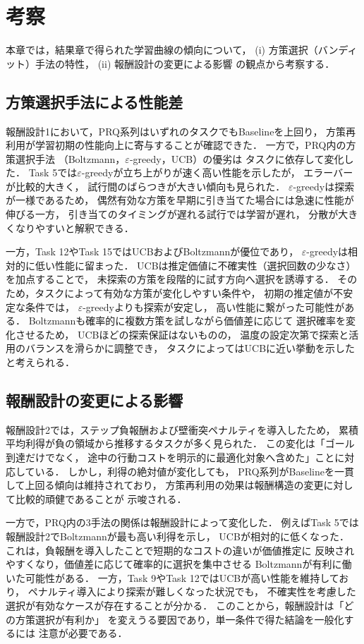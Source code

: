 \section{考察}
本章では，結果章で得られた学習曲線の傾向について，
(i) 方策選択（バンディット）手法の特性，
(ii) 報酬設計の変更による影響
の観点から考察する．

\subsection{方策選択手法による性能差}
報酬設計1において，PRQ系列はいずれのタスクでもBaselineを上回り，
方策再利用が学習初期の性能向上に寄与することが確認できた．
一方で，PRQ内の方策選択手法
（Boltzmann，$\varepsilon$-greedy，UCB）の優劣は
タスクに依存して変化した．
Task 5では$\varepsilon$-greedyが立ち上がりが速く高い性能を示したが，
エラーバーが比較的大きく，
試行間のばらつきが大きい傾向も見られた．
$\varepsilon$-greedyは探索が一様であるため，
偶然有効な方策を早期に引き当てた場合には急速に性能が伸びる一方，
引き当てのタイミングが遅れる試行では学習が遅れ，
分散が大きくなりやすいと解釈できる．

一方，Task 12やTask 15ではUCBおよびBoltzmannが優位であり，
$\varepsilon$-greedyは相対的に低い性能に留まった．
UCBは推定価値に不確実性（選択回数の少なさ）を加点することで，
未探索の方策を段階的に試す方向へ選択を誘導する．
そのため，タスクによって有効な方策が変化しやすい条件や，
初期の推定値が不安定な条件では，
$\varepsilon$-greedyよりも探索が安定し，
高い性能に繋がった可能性がある．
Boltzmannも確率的に複数方策を試しながら価値差に応じて
選択確率を変化させるため，
UCBほどの探索保証はないものの，
温度の設定次第で探索と活用のバランスを滑らかに調整でき，
タスクによってはUCBに近い挙動を示したと考えられる．

\subsection{報酬設計の変更による影響}
報酬設計2では，ステップ負報酬および壁衝突ペナルティを導入したため，
累積平均利得が負の領域から推移するタスクが多く見られた．
この変化は「ゴール到達だけでなく，
途中の行動コストを明示的に最適化対象へ含めた」ことに対応している．
しかし，利得の絶対値が変化しても，
PRQ系列がBaselineを一貫して上回る傾向は維持されており，
方策再利用の効果は報酬構造の変更に対して比較的頑健であることが
示唆される．

一方で，PRQ内の3手法の関係は報酬設計によって変化した．
例えばTask 5では報酬設計2でBoltzmannが最も高い利得を示し，
UCBが相対的に低くなった．
これは，負報酬を導入したことで短期的なコストの違いが価値推定に
反映されやすくなり，価値差に応じて確率的に選択を集中させる
Boltzmannが有利に働いた可能性がある．
一方，Task 9やTask 12ではUCBが高い性能を維持しており，
ペナルティ導入により探索が難しくなった状況でも，
不確実性を考慮した選択が有効なケースが存在することが分かる．
このことから，報酬設計は「どの方策選択が有利か」
を変えうる要因であり，単一条件で得た結論を一般化するには
注意が必要である．


